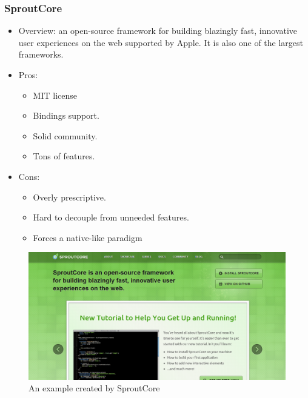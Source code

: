 \documentclass[14pt,a4paper]{extreport}
\begin{document}
		\subsubsection{SproutCore}
			\begin{itemize}
			\item Overview: an open-source framework for building blazingly fast, innovative user experiences on the web supported by Apple. It is also one of the largest frameworks.
				\item Pros: 
					\begin{itemize}
						\item MIT license
						\item Bindings support.
						\item Solid community. 
						\item Tons of features.
					
					\end{itemize}
				\item Cons:
					\begin{itemize}
						\item Overly prescriptive. 
						\item Hard to decouple from unneeded features.
						\item Forces a native-like paradigm
						
					\end{itemize}
			\end{itemize}
			\begin{figure}
				\begin{center}
				\includegraphics[scale=0.5]{Sproutcore.png}
				\caption{An example created by SproutCore}
				\end{center}
			
			\end{figure}
\end{document}
